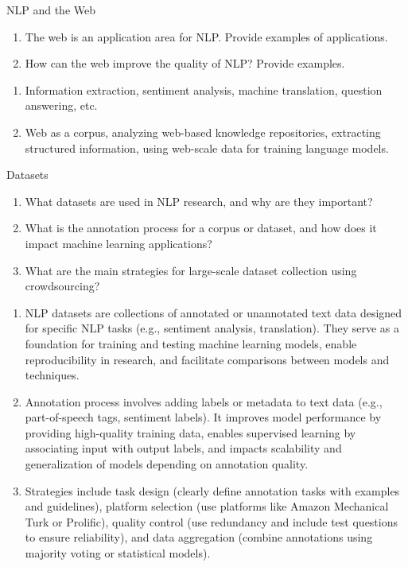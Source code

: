 \documentclass{article}
\author{Leopold Lemmermann}
\begin{document}
\createtitle


\begin{exercise}{NLP and the Web}
  \begin{enumerate}
    \item The web is an application area for NLP. Provide examples of applications.
    \item How can the web improve the quality of NLP? Provide examples.
  \end{enumerate}

  \begin{solution}
    \begin{enumerate}
      \item Information extraction, sentiment analysis, machine translation, question answering, etc.
      \item Web as a corpus, analyzing web-based knowledge repositories, extracting structured information, using web-scale data for training language models.
    \end{enumerate}
  \end{solution}
\end{exercise}

\begin{exercise}{Datasets}
  \begin{enumerate}
    \item What datasets are used in NLP research, and why are they important?
    \item What is the annotation process for a corpus or dataset, and how does it impact machine learning applications?
    \item What are the main strategies for large-scale dataset collection using crowdsourcing?
  \end{enumerate}

  \begin{solution}
    \begin{enumerate}
      \item NLP datasets are collections of annotated or unannotated text data designed for specific NLP tasks (e.g., sentiment analysis, translation). They serve as a foundation for training and testing machine learning models, enable reproducibility in research, and facilitate comparisons between models and techniques.
      \item Annotation process involves adding labels or metadata to text data (e.g., part-of-speech tags, sentiment labels). It improves model performance by providing high-quality training data, enables supervised learning by associating input with output labels, and impacts scalability and generalization of models depending on annotation quality.
      \item Strategies include task design (clearly define annotation tasks with examples and guidelines), platform selection (use platforms like Amazon Mechanical Turk or Prolific), quality control (use redundancy and include test questions to ensure reliability), and data aggregation (combine annotations using majority voting or statistical models).
    \end{enumerate}
  \end{solution}
\end{exercise}
\end{document}
